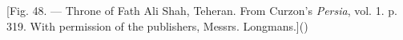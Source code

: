 \documentclass[a4paper, 11pt, oneside, polutonikogreek, english]{article}
\begin{document}
[Fig. 48. --- Throne of Fath Ali Shah, Teheran. From Curzon's \emph{Persia}, vol. 1. p. 319. With permission of the publishers, Messrs. Longmans.]()

\end{document}
